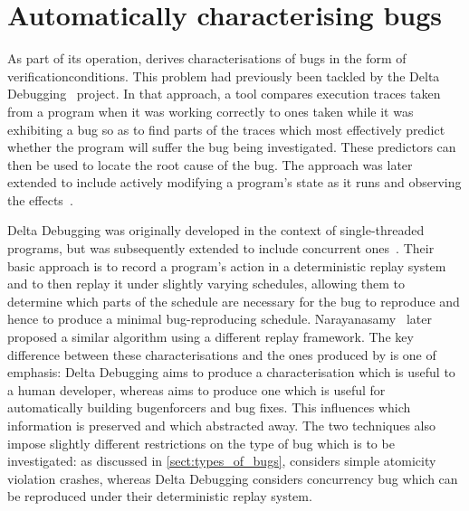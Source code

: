 \section{Automatically characterising bugs}
\label{sect:rw:auto_characterise}

As part of its operation, {\technique} derives characterisations of
bugs in the form of \glspl{verificationcondition}.  This problem had
previously been tackled by the Delta Debugging~\cite{Cleve2005}
project.  In that approach, a tool compares execution traces taken
from a program when it was working correctly to ones taken while it
was exhibiting a bug so as to find parts of the traces which most
effectively predict whether the program will suffer the bug being
investigated.  These predictors can then be used to locate the root
cause of the bug.  The approach was later extended to include actively
modifying a program's state as it runs and observing the
effects~\cite{Jeffrey2009}.

Delta Debugging was originally developed in the context of
single-threaded programs, but was subsequently extended to include
concurrent ones~\cite{Choi2002}.  Their basic approach is to record a
program's action in a deterministic replay system and to then replay
it under slightly varying schedules, allowing them to determine which
parts of the schedule are necessary for the bug to reproduce and hence
to produce a minimal bug-reproducing schedule.
Narayanasamy~\cite{Narayanasamy2007} later proposed a similar
algorithm using a different replay framework.  The key difference
between these characterisations and the ones produced by {\technique}
is one of emphasis: Delta Debugging aims to produce a characterisation
which is useful to a human developer, whereas {\technique} aims to
produce one which is useful for automatically building
\glspl{bugenforcer} and bug fixes.  This influences which information
is preserved and which abstracted away.  The two techniques also
impose slightly different restrictions on the type of bug which is to
be investigated: as discussed in \autoref{sect:types_of_bugs},
{\technique} considers simple atomicity violation crashes, whereas
Delta Debugging considers concurrency bug which can be reproduced
under their deterministic replay system.

